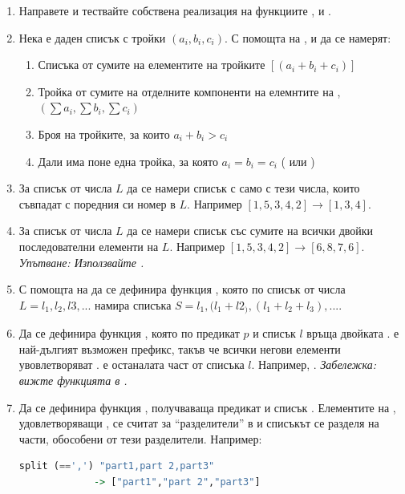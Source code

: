 \begin{enumerate}[]
	\item Направете и тествайте собствена реализация на функциите ,  и .
	\item Нека е даден списък  с тройки $(a_i,b_i,c_i)$. С помощта на ,  и  да се намерят:
	
	\begin{enumerate}[label=\alph*)]
		\item Списъка от сумите на елементите на тройките $[(a_i+b_i+c_i)]$
		\item Тройка от сумите на отделните компоненти на елемнтите на , $(\sum a_i,\sum b_i, \sum c_i)$
		\item Броя на тройките, за които $a_i+b_i>c_i$
		\item Дали има поне една тройка, за която $a_i=b_i=c_i$ ( или )
	\end{enumerate}
	\item За списък от числа $L$ да се намери списък с само с тези числа, които съвпадат с поредния си номер в $L$. Например $[1,5,3,4,2] \rightarrow [1,3,4]$.

	\item За списък от числа $L$ да се намери списък със сумите на всички двойки последователни елементи на $L$. Например $[1,5,3,4,2] \rightarrow [6,8,7,6]$. \emph{Упътване: Използвайте .}
	
	\item С помощта на  да се дефинира функция , която по списък от числа $L=l_1,l_2,l3,...$ намира списъка $S=l_1,(l_1+l2_),(l_1+l_2+l_3),...$. 
	
	\item Да се дефинира функция , която по предикат $p$ и списък $l$ връща двойката .  е най-дългият възможен префикс, такъв че всички негови елементи увовлетворяват .  е останалата част от списъка $l$. Например, . \emph{Забележка: вижте функцията   в .}
	
	\item \label{zad:split}Да се дефинира функция , получваваща предикат  и списък . Елементите на , удовлетворяващи , се считат за ``разделители'' в  и списъкът се разделя на части, обособени от тези разделители. Например:
\begin{lstlisting}[basicstyle=\small,language=Haskell]
split (==',') "part1,part 2,part3" 
             -> ["part1","part 2","part3"]
\end{lstlisting}
\end{enumerate}

